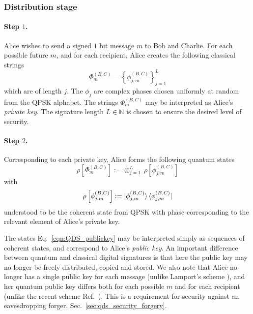 \subsubsection{Distribution stage}

\paragraph{Step $1$.}
Alice wishes to send a signed $1$ bit message $m$ to Bob and Charlie. For each possible future $m$, and for each recipient, Alice creates the following classical strings
\begin{equation}
\Phi_m^{\left(B, C\right)} = \left\{ \phi_{j, m}^{\left(B, C\right)}\right\}_{j=1}^{L}
\end{equation}
which are of length $j$. The $\phi_{j}$ are complex phases chosen uniformly at random from the QPSK alphabet. The strings $\Phi_m^{\left(B, C\right)}$ may be interpreted as Alice's \emph{private key}. The signature length $L \in \mathbb{N}$ is chosen to ensure the desired level of security.

\paragraph{Step $2$.} Corresponding to each private key, Alice forms the following quantum states
\begin{equation}\label{eqn:QDS_publickey}
\rho\left[\Phi_m^{\left(B, C\right)}\right] := \otimes_{j=1}^L \; \rho\left[\phi_{j, m}^{\left(B, C\right)}\right]
\end{equation}
with
\begin{equation}
\rho\left[\phi_{j, m}^{\left(B, C\right)}\right] := \ket{\phi_{j, m}^{\left(B, C\right)}} \bra{\phi_{j, m}^{\left(B, C\right)}} \notag
\end{equation}
understood to be the coherent state from QPSK with phase corresponding to the relevant element of Alice's private key.

The states Eq.~\ref{eqn:QDS_publickey} may be interpreted simply as sequences of coherent states, and correspond to Alice's \emph{public key}. An important difference between quantum and classical digital signatures is that here the public key may no longer be freely distributed, copied and stored. We also note that Alice no longer has a single public key for each message (unlike Lamport's scheme \cite{Lamport1979}), and her quantum public key differs both for each possible $m$ and for each recipient (unlike the recent scheme Ref.~\cite{Croal2016}). This is a requirement for security against an eavesdropping forger, Sec.~\ref{sec:qds_security_forgery}.

